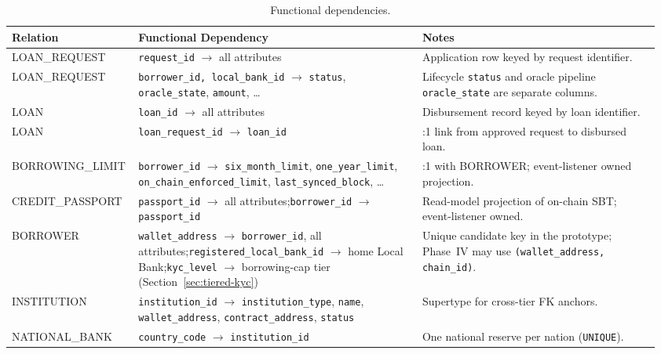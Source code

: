 \documentclass[12pt,a4paper]{report}
\newcommand{\tableheadcolor}{\rowcolor{TableHeadBg}}
\begin{document}
\begin{table}[H]
\centering
\caption[Functional dependencies]{Functional dependencies.}
\label{tab:functional-deps}
\begingroup
\footnotesize
\setlength{\tabcolsep}{3pt}
\renewcommand{\arraystretch}{1.15}
\begin{tabular}{@{}%
  >{\raggedright\arraybackslash}p{0.17\linewidth}%
  >{\raggedright\arraybackslash}p{0.43\linewidth}%
  >{\raggedright\arraybackslash}p{0.36\linewidth}@{}}
\toprule
\tableheadcolor
\textbf{Relation} & \textbf{Functional Dependency} & \textbf{Notes} \\
\midrule
LOAN\_REQUEST & \texttt{request\_id} $\to$ all attributes & Application row keyed by request identifier. \\
LOAN\_REQUEST & \texttt{borrower\_id, local\_bank\_id} $\to$ \texttt{status}, \texttt{oracle\_state}, \texttt{amount}, \ldots & Lifecycle \texttt{status} and oracle pipeline \texttt{oracle\_state} are separate columns. \\
LOAN & \texttt{loan\_id} $\to$ all attributes & Disbursement record keyed by loan identifier. \\
LOAN & \texttt{loan\_request\_id} $\to$ \texttt{loan\_id} & 1:1 link from approved request to disbursed loan. \\
BORROWING\_LIMIT & \texttt{borrower\_id} $\to$ \texttt{six\_month\_limit}, \texttt{one\_year\_limit}, \newline \texttt{on\_chain\_enforced\_limit}, \texttt{last\_synced\_block}, \ldots & 1:1 with BORROWER; event-listener owned projection. \\
CREDIT\_PASSPORT & \texttt{passport\_id} $\to$ all attributes;\newline \texttt{borrower\_id} $\to$ \texttt{passport\_id} & Read-model projection of on-chain SBT; event-listener owned. \\
BORROWER & \texttt{wallet\_address} $\to$ \texttt{borrower\_id}, all attributes;\newline \texttt{registered\_local\_bank\_id} $\to$ home Local Bank;\newline \texttt{kyc\_level} $\to$ borrowing-cap tier (Section~\ref{sec:tiered-kyc}) & Unique candidate key in the prototype; Phase~IV may use \texttt{(wallet\_address, chain\_id)}. \\
INSTITUTION & \texttt{institution\_id} $\to$ \texttt{institution\_type}, \texttt{name}, \texttt{wallet\_address}, \texttt{contract\_address}, \texttt{status} & Supertype for cross-tier FK anchors. \\
NATIONAL\_BANK & \texttt{country\_code} $\to$ \texttt{institution\_id} & One national reserve per nation (\texttt{UNIQUE}). \\

\end{tabular}
\end{table}
\end{document}
